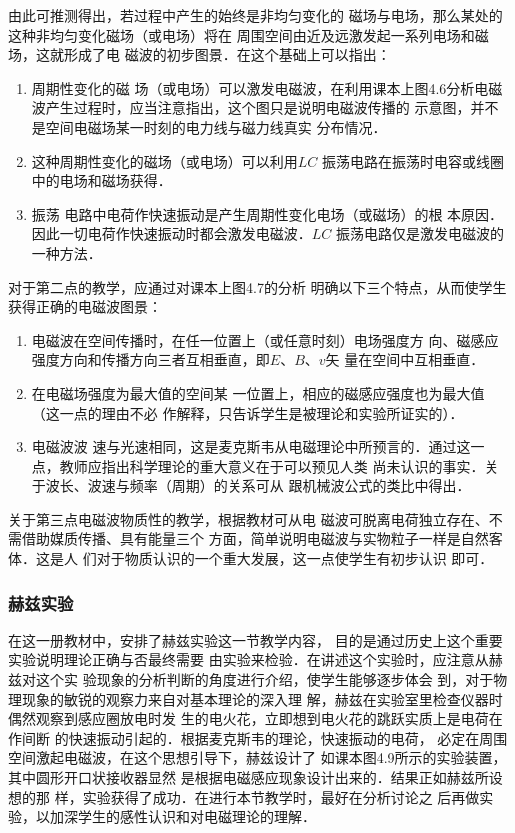 由此可推测得出，若过程中产生的始终是非均匀变化的
磁场与电场，那么某处的这种非均匀变化磁场（或电场）将在
周围空间由近及远激发起一系列电场和磁场，这就形成了电
磁波的初步图景．在这个基础上可以指出：
\begin{enumerate}
\item 周期性变化的磁
场（或电场）可以激发电磁波，在利用课本上图4.6分析电磁
波产生过程时，应当注意指出，这个图只是说明电磁波传播的
示意图，并不是空间电磁场某一时刻的电力线与磁力线真实
分布情况．
\item 这种周期性变化的磁场（或电场）可以利用$LC$
振荡电路在振荡时电容或线圈中的电场和磁场获得．
\item 振荡
电路中电荷作快速振动是产生周期性变化电场（或磁场）的根
本原因．因此一切电荷作快速振动时都会激发电磁波．$LC$
振荡电路仅是激发电磁波的一种方法．
\end{enumerate}

对于第二点的教学，应通过对课本上图4.7的分析
明确以下三个特点，从而使学生获得正确的电磁波图景：
\begin{enumerate}
\item 电磁波在空间传播时，在任一位置上（或任意时刻）电场强度方
向、磁感应强度方向和传播方向三者互相垂直，即$E$、$B$、$v$矢
量在空间中互相垂直．
\item 在电磁场强度为最大值的空间某
一位置上，相应的磁感应强度也为最大值（这一点的理由不必
作解释，只告诉学生是被理论和实验所证实的）．
\item 电磁波波
速与光速相同，这是麦克斯韦从电磁理论中所预言的．通过这一点，教师应指出科学理论的重大意义在于可以预见人类
尚未认识的事实．关于波长、波速与频率（周期）的关系可从
跟机械波公式的类比中得出．
\end{enumerate}

关于第三点电磁波物质性的教学，根据教材可从电
磁波可脱离电荷独立存在、不需借助媒质传播、具有能量三个
方面，简单说明电磁波与实物粒子一样是自然客体．这是人
们对于物质认识的一个重大发展，这一点使学生有初步认识
即可．

\subsubsection{赫兹实验}

在这一册教材中，安排了赫兹实验这一节教学内容，
目的是通过历史上这个重要实验说明理论正确与否最终需要
由实验来检验．在讲述这个实验时，应注意从赫兹对这个实
验现象的分析判断的角度进行介绍，使学生能够逐步体会
到，对于物理现象的敏锐的观察力来自对基本理论的深入理
解，赫兹在实验室里检查仪器时偶然观察到感应圈放电时发
生的电火花，立即想到电火花的跳跃实质上是电荷在作间断
的快速振动引起的．根据麦克斯韦的理论，快速振动的电荷，
必定在周围空间激起电磁波，在这个思想引导下，赫兹设计了
如课本图4.9所示的实验装置，其中圆形开口状接收器显然
是根据电磁感应现象设计出来的．结果正如赫兹所设想的那
样，实验获得了成功．在进行本节教学时，最好在分析讨论之
后再做实验，以加深学生的感性认识和对电磁理论的理解．


